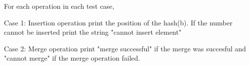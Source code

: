 For each operation in each test case,  

   Case 1: Insertion operation print the position of the hash(b). If the number cannot be inserted print the string "cannot insert element"  

   Case 2: Merge operation print "merge successful" if the merge was succesful and "cannot merge" if the merge operation failed.